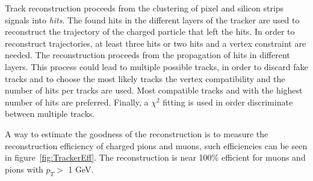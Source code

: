 Track reconstruction proceeds from the clustering of pixel and silicon strips signals into \textit{hits}. The found hits in the different layers of the tracker are used to reconstruct the trajectory of the charged particle that left the hits. In order to reconstruct trajectories, at least three hits or two hits and a vertex constraint are needed. The reconstruction proceeds from the propagation of hits in different layers. This process could lead to multiple possible tracks, in order to discard fake tracks and to choose the most likely tracks the vertex compatibility and the number of hits per tracks are used. Most compatible tracks and with the highest number of hits are preferred. Finally, a $\chi^{2}$ fitting is used in order discriminate between multiple tracks. 

A way to estimate the goodness of the reconstruction is to measure the reconstruction efficiency of charged pions and muons, such efficiencies can be seen in figure~\ref{fig:TrackerEff}. The reconstruction is near 100\% efficient for muons and pions with $p_{T}>$ 1 GeV.

